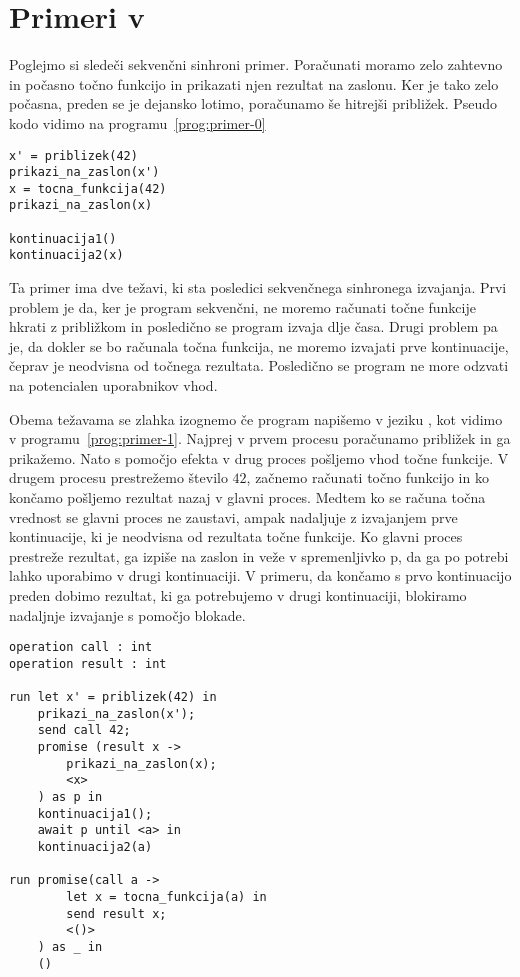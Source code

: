 \section{Primeri v \aeff{}} \label{sec:primeri-aeff}

Poglejmo si sledeči sekvenčni sinhroni primer. Poračunati moramo zelo zahtevno in počasno točno funkcijo in prikazati njen rezultat na zaslonu. Ker je tako zelo počasna, preden se je dejansko lotimo, poračunamo še hitrejši približek. Pseudo kodo vidimo na programu~\ref{prog:primer-0}

\begin{lstlisting}[caption={Sinhron sekvečni primer.},label={prog:primer-0},float,floatplacement=h]
x' = priblizek(42)
prikazi_na_zaslon(x')
x = tocna_funkcija(42)
prikazi_na_zaslon(x)

kontinuacija1()
kontinuacija2(x)
\end{lstlisting}

Ta primer ima dve težavi, ki sta posledici sekvenčnega sinhronega izvajanja. Prvi problem je da, ker je program sekvenčni, ne moremo računati točne funkcije hkrati z približkom in posledično se program izvaja dlje časa. Drugi problem pa je, da dokler se bo računala točna funkcija, ne moremo izvajati prve kontinuacije, čeprav je neodvisna od točnega rezultata. Posledično se program ne more odzvati na potencialen uporabnikov vhod.  

Obema težavama se zlahka izognemo če program napišemo v jeziku \aeff, kot vidimo v programu~\ref{prog:primer-1}. Najprej v prvem procesu poračunamo približek in ga prikažemo. Nato s pomočjo efekta v drug proces pošljemo vhod točne funkcije. V drugem procesu prestrežemo število $42$, začnemo računati točno funkcijo in ko končamo pošljemo rezultat nazaj v glavni proces. Medtem ko se računa točna vrednost se glavni proces ne zaustavi, ampak nadaljuje z izvajanjem prve kontinuacije, ki je neodvisna od rezultata točne funkcije. Ko glavni proces prestreže rezultat, ga izpiše na zaslon in veže v spremenljivko p, da ga po potrebi lahko uporabimo v drugi kontinuaciji. V primeru, da končamo s prvo kontinuacijo preden dobimo rezultat, ki ga potrebujemo v drugi kontinuaciji, blokiramo nadaljnje izvajanje s pomočjo blokade.

\begin{lstlisting}[caption={Asinhron Vzporeden primer.},label={prog:primer-1},float,floatplacement=h]
operation call : int
operation result : int
 
run let x' = priblizek(42) in
    prikazi_na_zaslon(x');
    send call 42;
    promise (result x ->
    	prikazi_na_zaslon(x);
    	<x>
    ) as p in
    kontinuacija1();
    await p until <a> in
    kontinuacija2(a)

run promise(call a ->
    	let x = tocna_funkcija(a) in
    	send result x;
    	<()>
    ) as _ in
    ()
\end{lstlisting}
